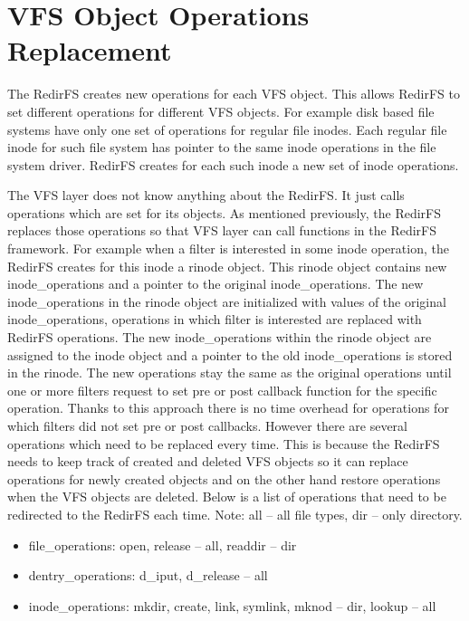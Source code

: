 \documentclass[oneside, 11pt, a4]{article}
\begin{document}
\section{VFS Object Operations Replacement}
The RedirFS creates new operations for each VFS object. This allows RedirFS to
set different operations for different VFS objects. For example disk based file
systems have only one set of operations for regular file inodes. Each regular
file inode for such file system has pointer to the same inode operations in the
file system driver. RedirFS creates for each such inode a new set of inode
operations.

The VFS layer does not know anything about the RedirFS. It just calls operations
which are set for its objects. As mentioned previously, the RedirFS replaces
those operations so that VFS layer can call functions in the RedirFS framework.
For example when a filter is interested in some inode operation, the RedirFS
creates for this inode a rinode object. This rinode object contains new
inode\_operations and a pointer to the original inode\_operations. The new
inode\_operations in the rinode object are initialized with values of the
original inode\_operations, operations in which filter is interested are replaced
with RedirFS operations. The new inode\_operations within the rinode object are
assigned to the inode object and a pointer to the old inode\_operations is stored
in the rinode. The new operations stay the same as the original operations until
one or more filters request to set pre or post callback function for the
specific operation. Thanks to this approach there is no time overhead for
operations for which filters did not set pre or post callbacks. However there
are several operations which need to be replaced every time. This is because the
RedirFS needs to keep track of created and deleted VFS objects so it can replace
operations for newly created objects and on the other hand restore operations
when the VFS objects are deleted. Below is a list of operations that need to be
redirected to the RedirFS each time. Note: all -- all file types, dir -- only
directory.

\begin{itemize}
\item file\_operations: open, release -- all, readdir -- dir
\item dentry\_operations: d\_iput, d\_release -- all
\item inode\_operations: mkdir, create, link, symlink, mknod -- dir, lookup -- all
\end{itemize}
\end{document}
